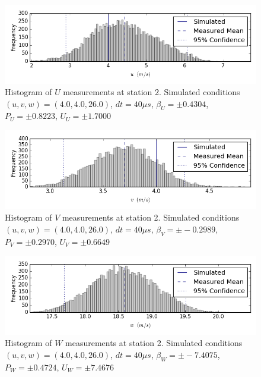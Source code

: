 \begin{figure}[H]
\centering
\includegraphics[width=6in]{figs/Ely_May28th02002/uncertainty_Ely_May28th02002_U}
\caption{Histogram of $U$ measurements at station 2. Simulated conditions $(u,v,w)=(4.0, 4.0, 26.0)$, $dt=40 \mu s$, $\beta_U=\pm 0.4304$, $P_U=\pm 0.8223$, $U_U=\pm 1.7000$}
\label{fig:uncertainty_Ely_May28th02002_U}
\end{figure}


\begin{figure}[H]
\centering
\includegraphics[width=6in]{figs/Ely_May28th02002/uncertainty_Ely_May28th02002_V}
\caption{Histogram of $V$ measurements at station 2. Simulated conditions $(u,v,w)=(4.0, 4.0, 26.0)$, $dt=40 \mu s$, $\beta_V=\pm -0.2989$, $P_V=\pm 0.2970$, $U_V=\pm 0.6649$}
\label{fig:uncertainty_Ely_May28th02002_V}
\end{figure}


\begin{figure}[H]
\centering
\includegraphics[width=6in]{figs/Ely_May28th02002/uncertainty_Ely_May28th02002_W}
\caption{Histogram of $W$ measurements at station 2. Simulated conditions $(u,v,w)=(4.0, 4.0, 26.0)$, $dt=40 \mu s$, $\beta_W=\pm -7.4075$, $P_W=\pm 0.4724$, $U_W=\pm 7.4676$}
\label{fig:uncertainty_Ely_May28th02002_W}
\end{figure}


